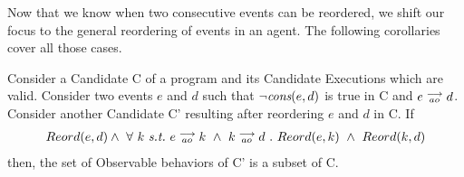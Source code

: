 Now that we know when two consecutive events can be reordered, we shift our focus to the general reordering of events in an agent. The following corollaries cover all those cases. 

\begin{corollary}
    \label{CorollReord}
    Consider a Candidate C of a program and its Candidate Executions which are valid. 
    Consider two events $e$ and $d$ such that $\neg \textit{cons}(e,d)$ is true in C and $e\stackrel{\longrightarrow}{_{ao}}d$. 
    Consider another Candidate C' resulting after reordering $e$ and $d$ in C. 
    If
    \begin{align*}
        Reord(e,d) \wedge \ 
        \forall \ k \ \textit{s.t.} \ 
        \reln{e}{ao}{k} \ \wedge \ \reln{k}{ao}{d} \ . \ 
        Reord(e,k) \ \wedge \ Reord(k,d)    
    \end{align*}
    then, the set of Observable behaviors of C' is a subset of C. 
    \label{corol1}
\end{corollary}
    
